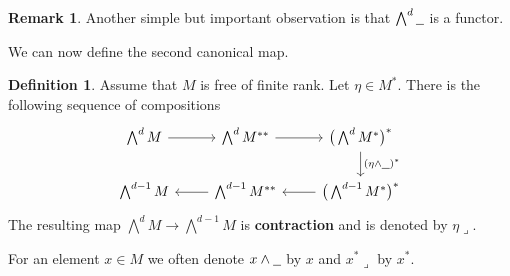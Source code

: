 \documentclass[12pt]{article}
\theoremstyle{plain}
\theoremstyle{definition}
\newtheorem{defn}[thm]{Definition} %
\newtheorem{remark}[thm]{Remark}
\newcommand{\und}[1]{\underline{\hspace{#1 cm}}}
\newcommand{\lto}{\longrightarrow}
\begin{document}
\begin{remark}
	Another simple but important observation is that $\bigwedge^d \und{0.2}$ is a functor.
\end{remark}
We can now define the second canonical map.
\begin{defn}
	Assume that $M$ is free of finite rank. Let $\eta \in M^\ast$. There is the following sequence of compositions
	\begin{equation}\label{eq:contraction}
		\begin{tikzcd}
			{\bigwedge^d M}\arrow[r] & {\bigwedge^d M^{\ast\ast}}\arrow[r] & {\big(\bigwedge^d M^\ast\big)^\ast}\arrow[d,"{(\eta \wedge \und{0.2})^\ast}"]\\
			{\bigwedge^{d-1} M} & {\bigwedge^{d-1}M^{\ast\ast}}\arrow[l]& {\big(\bigwedge^{d-1} M^\ast\big)^{\ast}}\arrow[l]
		\end{tikzcd}
	\end{equation}
	The resulting map $\bigwedge^d M \lto \bigwedge^{d-1}M$ is \textbf{contraction} and is denoted by $\eta \lrcorner$.
	
	For an element $x \in M$ we often denote $x \wedge \und{0.2}$ by $x$ and $x^\ast \lrcorner$ by $x^\ast$.
\end{defn}
\end{document}
